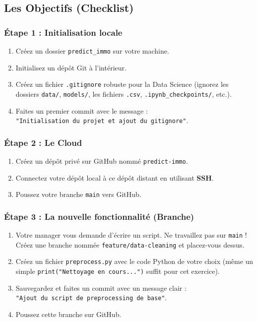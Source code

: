 \documentclass[
  letterpaper,
  DIV=11,
  numbers=noendperiod]{scrreprt}
\providecommand{\tightlist}{%
  \setlength{\itemsep}{0pt}\setlength{\parskip}{0pt}}
\begin{document}
\subsection{Les Objectifs (Checklist)}\label{les-objectifs-checklist}

\subsubsection{Étape 1 : Initialisation
locale}\label{uxe9tape-1-initialisation-locale}

\begin{enumerate}
\def\labelenumi{\arabic{enumi}.}
\tightlist
\item
  Créez un dossier \texttt{predict\_immo} sur votre machine.
\item
  Initialisez un dépôt Git à l'intérieur.
\item
  Créez un fichier \texttt{.gitignore} robuste pour la Data Science
  (ignorez les dossiers \texttt{data/}, \texttt{models/}, les fichiers
  \texttt{.csv}, \texttt{.ipynb\_checkpoints/}, etc.).
\item
  Faites un premier commit avec le message :
  \texttt{"Initialisation\ du\ projet\ et\ ajout\ du\ gitignore"}.
\end{enumerate}

\subsubsection{Étape 2 : Le Cloud}\label{uxe9tape-2-le-cloud}

\begin{enumerate}
\def\labelenumi{\arabic{enumi}.}
\tightlist
\item
  Créez un dépôt privé sur GitHub nommé \texttt{predict-immo}.
\item
  Connectez votre dépôt local à ce dépôt distant en utilisant
  \textbf{SSH}.
\item
  Poussez votre branche \texttt{main} vers GitHub.
\end{enumerate}

\subsubsection{Étape 3 : La nouvelle fonctionnalité
(Branche)}\label{uxe9tape-3-la-nouvelle-fonctionnalituxe9-branche}

\begin{enumerate}
\def\labelenumi{\arabic{enumi}.}
\tightlist
\item
  Votre manager vous demande d'écrire un script. Ne travaillez pas sur
  \texttt{main} ! Créez une branche nommée
  \texttt{feature/data-cleaning} et placez-vous dessus.
\item
  Créez un fichier \texttt{preprocess.py} avec le code Python de votre
  choix (même un simple \texttt{print("Nettoyage\ en\ cours...")} suffit
  pour cet exercice).
\item
  Sauvegardez et faites un commit avec un message clair :
  \texttt{"Ajout\ du\ script\ de\ preprocessing\ de\ base"}.
\item
  Poussez cette branche sur GitHub.
\end{enumerate}
\end{document}

